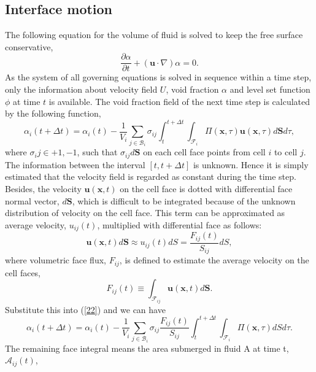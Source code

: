 \subsection{Interface motion}
The following equation for the volume of fluid is solved to keep the free surface conservative,
\begin{equation}\label{13}
\frac{\partial\alpha}{\partial{t}}+(\mathbf{u}\cdot\nabla)\alpha=0.
\end{equation}
As the system of all governing equations is solved in sequence within a time step, only the information about velocity field $U$, void fraction $\alpha$ and level set function $\phi$ at time $t$ is available. The void fraction field of the next time step is calculated by the following function,
\begin{equation}\label{22}
\alpha_i(t+\Delta{t})=\alpha_i(t) - \frac{1}{V_i}\sum_{j\in\mathscr{B}_i}\sigma_{ij}\int_t^{t+\Delta{t}}\int_{\mathscr{F}_i}{\Pi(\mathbf{x},\tau)\mathbf{u}(\mathbf{x},\tau)}{d\mathbf{S}d\tau},
\end{equation}
where $\sigma_ij\in{+1,-1}$, such that $\sigma_{ij}{d\mathbf{S}}$ on each cell face points from cell $i$ to cell $j$. The information between the interval $[t,t+\Delta{t}]$ is unknown. Hence it is simply estimated that the velocity field is regarded as constant during the time step. Besides, the velocity $\mathbf{u}(\mathbf{x},t)$ on the cell face is dotted with differential face normal vector, $d\mathbf{S}$, which is difficult to be integrated because of the unknown distribution of velocity on the cell face. This term can be approximated as average velocity, $u_{ij}(t)$, multiplied with differential face as follows:
\begin{equation}\label{24}
  \mathbf{u}(\mathbf{x},t)d\mathbf{S}\approx u_{ij}(t)dS =\frac{F_{ij}(t)}{S_{ij}}dS,
\end{equation}
where volumetric face flux, $F_{ij}$, is defined to estimate the average velocity on the cell faces,
\begin{equation}\label{23}
  F_{ij}(t)\equiv\int_{\mathscr{F}_{ij}}\mathbf{u}(\mathbf{x},t)d\mathbf{S}.
\end{equation}
Substitute this into (\ref{22}) and we can have
\begin{equation}\label{24}
  \alpha_i(t+\Delta{t})=\alpha_i(t) - \frac{1}{V_i}\sum_{j\in\mathscr{B}_i}\sigma_{ij}\frac{F_{ij}(t)}{S_{ij}}\int_t^{t+\Delta{t}}\int_{\mathscr{F}_i}{\Pi(\mathbf{x},\tau)dSd\tau}.
\end{equation}
The remaining face integral means the area submerged in fluid A at time t, $\mathscr{A}_{ij}(t)$,
